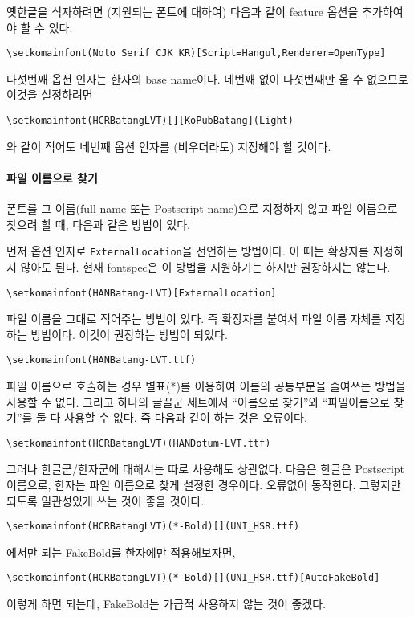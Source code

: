 \documentclass[
	12pt,
	a4paper,
	kosection,
	footnote,
	nobookmarks,
	microtype,
]{oblivoir}
\begin{document}
옛한글을 식자하려면 (지원되는 폰트에 대하여) 다음과 같이 feature 옵션을 추가하여야 할 수 있다.
\begin{verbatim}
\setkomainfont(Noto Serif CJK KR)[Script=Hangul,Renderer=OpenType]
\end{verbatim}

다섯번째 옵션 인자는 한자의 base name이다. 네번째 없이 다섯번째만 올 수 없으므로 이것을
설정하려면
\begin{verbatim}
\setkomainfont(HCRBatangLVT)[][KoPubBatang](Light)
\end{verbatim}
와 같이 적어도 네번째 옵션 인자를 (비우더라도) 지정해야 할 것이다.

\paragraph{파일 이름으로 찾기}
폰트를 그 이름(full name 또는 Postscript name)으로 지정하지 않고 파일 이름으로 찾으려 할 때,
다음과 같은 방법이 있다.

먼저 옵션 인자로 \texttt{ExternalLocation}을 선언하는 방법이다. 이 때는 확장자를 지정하지 않아도 된다. 현재 \textsf{fontspec}은 이 방법을 지원하기는 하지만 권장하지는 않는다.
\begin{verbatim}
\setkomainfont(HANBatang-LVT)[ExternalLocation]
\end{verbatim}
파일 이름을 그대로 적어주는 방법이 있다. 즉 확장자를 붙여서 파일 이름 자체를 지정하는 방법이다. 이것이 권장하는 방법이 되었다.
\begin{verbatim}
\setkomainfont(HANBatang-LVT.ttf)
\end{verbatim}

파일 이름으로 호출하는 경우 별표(*)를 이용하여 이름의 공통부분을 줄여쓰는 방법을 사용할 수 없다.
그리고 
하나의 글꼴군 세트에서 ``이름으로 찾기''와 ``파일이름으로 찾기''를 둘 다 사용할 수 없다. 즉 다음과 같이 하는 것은 오류이다.
\begin{verbatim}
\setkomainfont(HCRBatangLVT)(HANDotum-LVT.ttf)
\end{verbatim}
그러나 한글군/한자군에 대해서는 따로 사용해도 상관없다. 다음은 한글은 Postscript 이름으로,
한자는 파일 이름으로 찾게 설정한 경우이다. 오류없이 동작한다. 그렇지만 되도록 일관성있게 쓰는 것이 좋을 것이다.
\begin{verbatim}
\setkomainfont(HCRBatangLVT)(*-Bold)[](UNI_HSR.ttf)
\end{verbatim}
\XeTeX 에서만 되는 FakeBold를 한자에만 적용해보자면,
\begin{verbatim}
\setkomainfont(HCRBatangLVT)(*-Bold)[](UNI_HSR.ttf)[AutoFakeBold]
\end{verbatim}
이렇게 하면 되는데, FakeBold는 가급적 사용하지 않는 것이 좋겠다.
\end{document}

